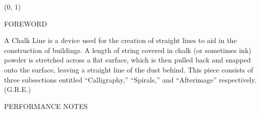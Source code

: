 \documentclass[11pt]{article}
\begin{document}
\begin{textblock}{23}(0, 1)
\begin{center}
\huge FOREWORD
\end{center}
\end{textblock}

\vspace*{0.25\baselineskip}

\begingroup
\begin{center}
A Chalk Line is a device used for the creation of straight lines to aid in the construction of buildings. A length of string covered in chalk (or sometimes ink) powder is stretched across a flat surface, which is then pulled back and snapped onto the surface, leaving a straight line of the dust behind. This piece consists of three subsections entitled ``Calligraphy,'' ``Spirals,'' and ``Afterimage'' respectively.
\rightskip\leftskip
\phantom{text} \hfill (G.R.E.)
\end{center}
\endgroup

\vspace*{1\baselineskip}

\begin{center}
\huge PERFORMANCE NOTES
\end{center}
\end{document}
